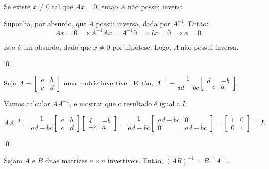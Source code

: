 \begin{Proposition}
	Se existe $x\neq 0$ tal que $Ax = 0$, então $A$ não possui inversa.
\end{Proposition}

\begin{Proof}
	Suponha, por absurdo, que $A$ possui inversa, dada por $A^{-1}$. Então:
	$$
	Ax = 0 \implies A^{-1}Ax = A^{-1}0 \implies Ix = 0 \implies x = 0.
	$$
	
	Isto é um absurdo, dado que $x\neq 0$ por hipótese. Logo, $A$ não possui inversa.
	
	\qed
\end{Proof}

\begin{Proposition}
	Seja $A = \begin{bmatrix}
		a & b \\
		c & d
	\end{bmatrix}$ uma matriz invertível. Então, $A^{-1} = \dfrac{1}{ad - bc}\begin{bmatrix}
		d & -b \\
		-c & a
	\end{bmatrix}$.
\end{Proposition}

\begin{Proof}
	Vamos calcular $AA^{-1}$, e mostrar que o resultado é igual a $I$:
	
	$$
	AA^{-1} = \dfrac{1}{ad - bc}\begin{bmatrix}
		a & b \\
		c & d
	\end{bmatrix}
	\begin{bmatrix}
		d & -b \\
		-c & a
	\end{bmatrix} = \dfrac{1}{ad - bc}
	\begin{bmatrix}
		ad - bc & 0 \\
		0 & ad - bc
	\end{bmatrix} = 
	\begin{bmatrix}
		1 & 0 \\
		0 & 1
	\end{bmatrix} = I.
	$$
	
	\qed
\end{Proof}

\begin{Proposition}
	Sejam $A$ e $B$ duas matrizes $n\times n$ invertíveis. Então, $(AB)^{-1} = B^{-1}A^{-1}$.
\end{Proposition}

